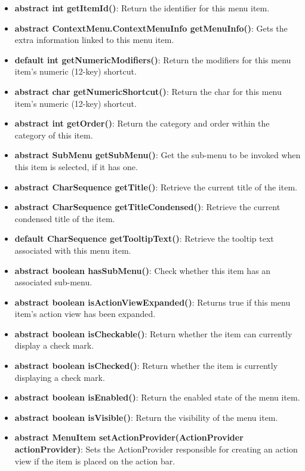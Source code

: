 \documentclass{report}
\begin{document}
\begin{itemize}
\begin{itemize}
\begin{itemize}
                \item \textbf{abstract int	getItemId()}: Return the identifier for this menu item.
                \item \textbf{abstract ContextMenu.ContextMenuInfo	getMenuInfo()}: Gets the extra information linked to this menu item.
                \item \textbf{default int	getNumericModifiers()}: Return the modifiers for this menu item's numeric (12-key) shortcut.
                \item \textbf{abstract char	getNumericShortcut()}: Return the char for this menu item's numeric (12-key) shortcut.
                \item \textbf{abstract int	getOrder()}: Return the category and order within the category of this item.
                \item \textbf{abstract SubMenu	getSubMenu()}: Get the sub-menu to be invoked when this item is selected, if it has one.
                \item \textbf{abstract CharSequence	getTitle()}: Retrieve the current title of the item.
                \item \textbf{abstract CharSequence	getTitleCondensed()}: Retrieve the current condensed title of the item.
                \item \textbf{default CharSequence	getTooltipText()}: Retrieve the tooltip text associated with this menu item.
                \item \textbf{abstract boolean	hasSubMenu()}: Check whether this item has an associated sub-menu.
                \item \textbf{abstract boolean	isActionViewExpanded()}: Returns true if this menu item's action view has been expanded.
                \item \textbf{abstract boolean	isCheckable()}: Return whether the item can currently display a check mark.
                \item \textbf{abstract boolean	isChecked()}: Return whether the item is currently displaying a check mark.
                \item \textbf{abstract boolean	isEnabled()}: Return the enabled state of the menu item.
                \item \textbf{abstract boolean	isVisible()}: Return the visibility of the menu item.
                \item \textbf{abstract MenuItem	setActionProvider(ActionProvider actionProvider)}: Sets the ActionProvider responsible for creating an action view if the item is placed on the action bar.

\end{itemize}
\end{itemize}
\end{itemize}
\end{document}
